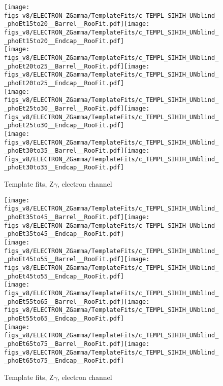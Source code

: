 \begin{figure}[htb]
  \begin{center}
   \texttt{[image: figs\_v8/ELECTRON\_ZGamma/TemplateFits/c\_TEMPL\_SIHIH\_UNblind\_\_phoEt15to20\_\_Barrel\_\_RooFit.pdf]}\texttt{[image: figs\_v8/ELECTRON\_ZGamma/TemplateFits/c\_TEMPL\_SIHIH\_UNblind\_\_phoEt15to20\_\_Endcap\_\_RooFit.pdf]}\\
   \texttt{[image: figs\_v8/ELECTRON\_ZGamma/TemplateFits/c\_TEMPL\_SIHIH\_UNblind\_\_phoEt20to25\_\_Barrel\_\_RooFit.pdf]}\texttt{[image: figs\_v8/ELECTRON\_ZGamma/TemplateFits/c\_TEMPL\_SIHIH\_UNblind\_\_phoEt20to25\_\_Endcap\_\_RooFit.pdf]}\\
   \texttt{[image: figs\_v8/ELECTRON\_ZGamma/TemplateFits/c\_TEMPL\_SIHIH\_UNblind\_\_phoEt25to30\_\_Barrel\_\_RooFit.pdf]}\texttt{[image: figs\_v8/ELECTRON\_ZGamma/TemplateFits/c\_TEMPL\_SIHIH\_UNblind\_\_phoEt25to30\_\_Endcap\_\_RooFit.pdf]}\\
   \texttt{[image: figs\_v8/ELECTRON\_ZGamma/TemplateFits/c\_TEMPL\_SIHIH\_UNblind\_\_phoEt30to35\_\_Barrel\_\_RooFit.pdf]}\texttt{[image: figs\_v8/ELECTRON\_ZGamma/TemplateFits/c\_TEMPL\_SIHIH\_UNblind\_\_phoEt30to35\_\_Endcap\_\_RooFit.pdf]}\\
  \label{fig:templateFits_SIHIH_ELECTRON_ZGamma_1}
  \caption{Template fits, Z$\gamma$, electron channel}
  \end{center}
\end{figure}

\begin{figure}[htb]
  \begin{center}
   \texttt{[image: figs\_v8/ELECTRON\_ZGamma/TemplateFits/c\_TEMPL\_SIHIH\_UNblind\_\_phoEt35to45\_\_Barrel\_\_RooFit.pdf]}\texttt{[image: figs\_v8/ELECTRON\_ZGamma/TemplateFits/c\_TEMPL\_SIHIH\_UNblind\_\_phoEt35to45\_\_Endcap\_\_RooFit.pdf]}\\
   \texttt{[image: figs\_v8/ELECTRON\_ZGamma/TemplateFits/c\_TEMPL\_SIHIH\_UNblind\_\_phoEt45to55\_\_Barrel\_\_RooFit.pdf]}\texttt{[image: figs\_v8/ELECTRON\_ZGamma/TemplateFits/c\_TEMPL\_SIHIH\_UNblind\_\_phoEt45to55\_\_Endcap\_\_RooFit.pdf]}\\
   \texttt{[image: figs\_v8/ELECTRON\_ZGamma/TemplateFits/c\_TEMPL\_SIHIH\_UNblind\_\_phoEt55to65\_\_Barrel\_\_RooFit.pdf]}\texttt{[image: figs\_v8/ELECTRON\_ZGamma/TemplateFits/c\_TEMPL\_SIHIH\_UNblind\_\_phoEt55to65\_\_Endcap\_\_RooFit.pdf]}\\
   \texttt{[image: figs\_v8/ELECTRON\_ZGamma/TemplateFits/c\_TEMPL\_SIHIH\_UNblind\_\_phoEt65to75\_\_Barrel\_\_RooFit.pdf]}\texttt{[image: figs\_v8/ELECTRON\_ZGamma/TemplateFits/c\_TEMPL\_SIHIH\_UNblind\_\_phoEt65to75\_\_Endcap\_\_RooFit.pdf]}\\
  \label{fig:templateFits_SIHIH_ELECTRON_ZGamma_2}
  \caption{Template fits, Z$\gamma$, electron channel}
  \end{center}
\end{figure}

